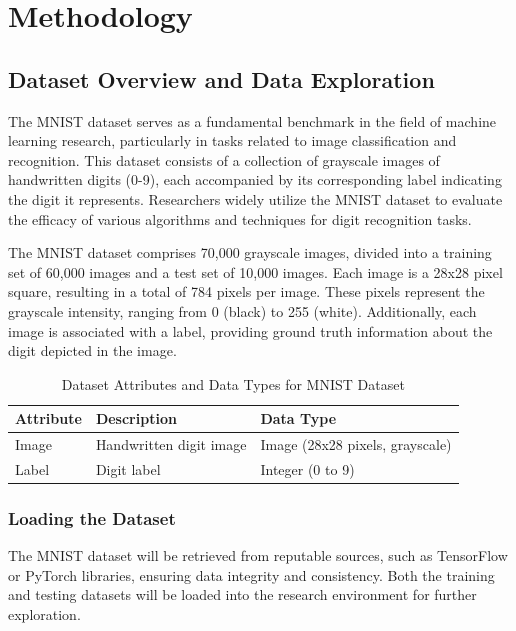 \chapter{Methodology}
\label{ch:method} %

\section{Dataset Overview and Data Exploration}

The MNIST dataset serves as a fundamental benchmark in the field of machine learning research, particularly in tasks related to image classification and recognition. This dataset consists of a collection of grayscale images of handwritten digits (0-9), each accompanied by its corresponding label indicating the digit it represents. Researchers widely utilize the MNIST dataset to evaluate the efficacy of various algorithms and techniques for digit recognition tasks.

The MNIST dataset comprises 70,000 grayscale images, divided into a training set of 60,000 images and a test set of 10,000 images. Each image is a 28x28 pixel square, resulting in a total of 784 pixels per image. These pixels represent the grayscale intensity, ranging from 0 (black) to 255 (white). Additionally, each image is associated with a label, providing ground truth information about the digit depicted in the image.

\begin{table}[htbp]
\centering
\caption{Dataset Attributes and Data Types for MNIST Dataset}
\label{tab:mnist_attributes}
\begin{tabular}{@{}lll@{}}
\toprule
\textbf{Attribute} & \textbf{Description}            & \textbf{Data Type} \\ \midrule
Image              & Handwritten digit image        & Image (28x28 pixels, grayscale) \\
Label              & Digit label                    & Integer (0 to 9) \\ 
\bottomrule
\end{tabular}
\end{table}

\subsection{Loading the Dataset} 

The MNIST dataset will be retrieved from reputable sources, such as TensorFlow or PyTorch libraries, ensuring data integrity and consistency. Both the training and testing datasets will be loaded into the research environment for further exploration.

